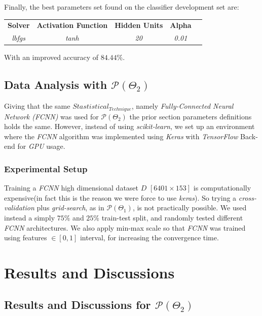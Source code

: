 Finally, the best parameters set found on the classifier development set are:
\begin{center}
    \begin{tabular}{ c c c c c }
    \textbf{Solver} & \textbf{Activation Function} & \textbf{Hidden Units}  &  \textbf{Alpha} \\
    \textit{lbfgs} & \textit{tanh} & \textit{20} & \textit{0.01} \\
    \end{tabular}
\end{center}
With an improved accuracy of $84.44\%$.

\subsection{Data Analysis with $\mathcal{P}(\Theta_{2})$}

Giving that the same $Stastistical_{Technique}$, namely \emph{Fully-Connected Neural Network (FCNN)} was used for  $\mathcal{P}(\Theta_{2})$ the prior section parameters definitions holds the same. However, instead of using \emph{scikit-learn}, we set up an environment where the \emph{FCNN} algorithm was implemented using \emph{Keras} with \emph{TensorFlow} Back-end for \emph{GPU} usage.

\subsubsection{Experimental Setup}
Training a \emph{FCNN} high dimensional dataset $D$ $[6401 \times 153]$ is computationally expensive(in fact this is the reason we were force to use \emph{keras}). So trying a \emph{cross-validation} plus  \emph{grid-search}, as in   $\mathcal{P}(\Theta_{1})$, is not practically possible. We used instead a simply $75\%$ and $25\%$ train-test split, and randomly tested different \emph{FCNN} architectures. We also apply min-max scale so that \emph{FCNN} was trained using features $\in [0,1]$ interval, for increasing the convergence time.

\section{Results and Discussions}

\subsection{Results and Discussions for  $\mathcal{P}(\Theta_{2})$}

